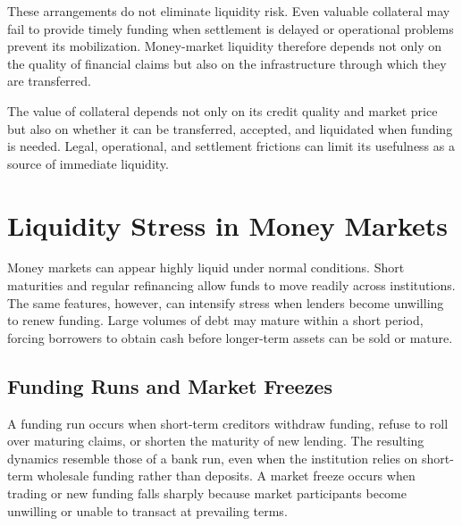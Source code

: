 These arrangements do not eliminate liquidity risk.
Even valuable collateral may fail to provide timely
funding when settlement is delayed or operational
problems prevent its mobilization. Money-market
liquidity therefore depends not only on the quality
of financial claims but also on the infrastructure
through which they are transferred.

\begin{tcolorbox}[
  enhanced,
  breakable,
  colback=white,
  colframe=FinanceBlue,
  boxrule=0.7pt,
  sharp corners,
  borderline west={2.2pt}{0pt}{FinanceBlue},
  title=\textbf{Financial Perspective: Collateral Must Be Mobilizable},
  coltitle=white,
  colbacktitle=FinanceBlue,
  fonttitle=\bfseries,
  before skip=1.2em,
  after skip=1.2em
]

The value of collateral depends not only on its
credit quality and market price but also on whether
it can be transferred, accepted, and liquidated
when funding is needed. Legal, operational, and
settlement frictions can limit its usefulness as
a source of immediate liquidity.

\end{tcolorbox}

\section{Liquidity Stress in Money Markets}

Money markets can appear highly liquid under normal conditions. Short maturities and regular refinancing allow funds to move readily across institutions. The same features, however, can intensify stress when lenders become unwilling to renew funding. Large volumes of debt may mature within a short period, forcing borrowers to obtain cash before longer-term assets can be sold or mature.

\subsection{Funding Runs and Market Freezes}

A funding run occurs when short-term creditors withdraw
funding, refuse to roll over maturing claims, or shorten
the maturity of new lending. The resulting dynamics
resemble those of a bank run, even when the institution
relies on short-term wholesale funding rather than
deposits. A market freeze occurs when trading or new funding
falls sharply because market participants become
unwilling or unable to transact at prevailing terms.

